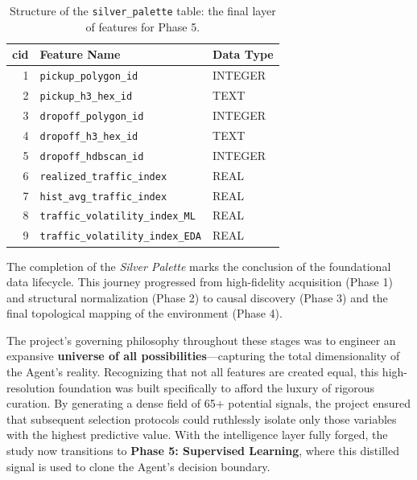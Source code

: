 \begin{table}[H]
    \centering
    \small
    \begin{tabular}{rl l}
        \toprule
        \textbf{cid} & \textbf{Feature Name} & \textbf{Data Type} \\
        \midrule
        1 & \texttt{pickup\_polygon\_id} & INTEGER \\
        2 & \texttt{pickup\_h3\_hex\_id} & TEXT \\
        \midrule
        3 & \texttt{dropoff\_polygon\_id} & INTEGER \\
        4 & \texttt{dropoff\_h3\_hex\_id} & TEXT \\
        5 & \texttt{dropoff\_hdbscan\_id} & INTEGER \\
        \midrule
        6 & \texttt{realized\_traffic\_index} & REAL \\
        7 & \texttt{hist\_avg\_traffic\_index} & REAL \\
        8 & \texttt{traffic\_volatility\_index\_ML} & REAL \\
        9 & \texttt{traffic\_volatility\_index\_EDA} & REAL \\
        \bottomrule
    \end{tabular}
    \caption{Structure of the \texttt{silver\_palette} table: the final layer of features for Phase 5.}
    \label{tab:silver_palette_schema}
\end{table}

\vspace{0.4cm}
The completion of the \textit{Silver Palette} marks the conclusion of the foundational data lifecycle. This journey progressed from high-fidelity acquisition (Phase 1) and structural normalization (Phase 2) to causal discovery (Phase 3) and the final topological mapping of the environment (Phase 4). 

The project’s governing philosophy throughout these stages was to engineer an expansive \textbf{universe of all possibilities}—capturing the total dimensionality of the Agent's reality. Recognizing that not all features are created equal, this high-resolution foundation was built specifically to afford the luxury of rigorous curation. By generating a dense field of 65+ potential signals, the project ensured that subsequent selection protocols could ruthlessly isolate only those variables with the highest predictive value. With the intelligence layer fully forged, the study now transitions to \textbf{Phase 5: Supervised Learning}, where this distilled signal is used to clone the Agent's decision boundary.

